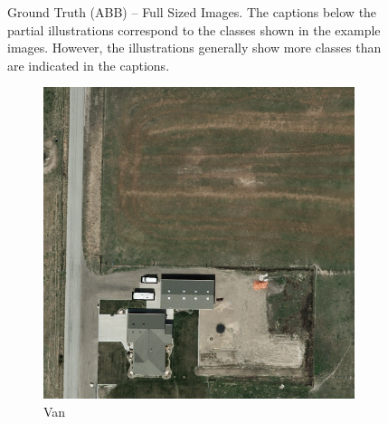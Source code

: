 \begin{figure}[h!]
    \caption[Ground Truth (ABB) – Full Sized Images]{Ground Truth (ABB) – Full Sized Images. The captions below the partial illustrations correspond to the classes shown in the example images. However, the illustrations generally show more classes than are indicated in the captions.}
    \label{fig:gt_abb_examples_fs}
\end{figure}



\begin{figure}[h!]
    \centering
    \begin{subfigure}[t]{0.38\textwidth}
        \centering
        \includegraphics[width=\linewidth]{images/015Results/01abb_vs_obb/comp_images/ground_truth_obb/198.png}
        \caption{Van}
    \end{subfigure}
    \begin{subfigure}[t]{0.38\textwidth}
        \centering

\end{subfigure}
\end{figure}
